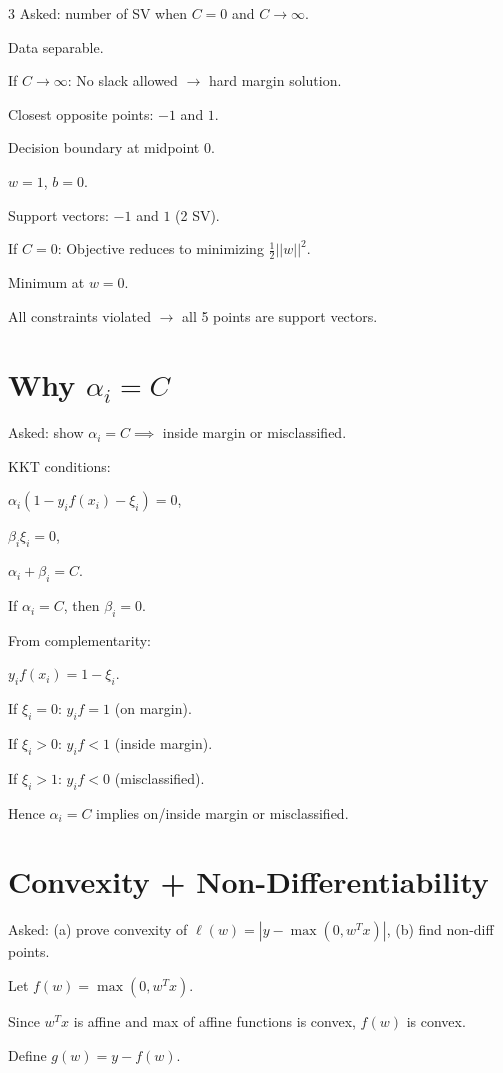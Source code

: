 \documentclass[8pt,fleqn]{extarticle}
\begin{document}
\begin{multicols}{3}
Asked: number of SV when $C=0$ and $C\to\infty$.

Data separable.

If $C\to\infty$:
No slack allowed $\to$ hard margin solution.

Closest opposite points: $-1$ and $1$.

Decision boundary at midpoint $0$.

$w=1$, $b=0$.

Support vectors: $-1$ and $1$ (2 SV).

If $C=0$:
Objective reduces to minimizing $\frac12||w||^2$.

Minimum at $w=0$.

All constraints violated $\to$ all 5 points are support vectors.


\section*{Why $\alpha_i=C$}

Asked: show $\alpha_i=C \implies$ inside margin or misclassified.

KKT conditions:

$\alpha_i(1-y_if(x_i)-\xi_i)=0$,

$\beta_i\xi_i=0$,

$\alpha_i+\beta_i=C$.

If $\alpha_i=C$,
then $\beta_i=0$.

From complementarity:

$y_if(x_i)=1-\xi_i$.

If $\xi_i=0$:
$y_if=1$ (on margin).

If $\xi_i>0$:
$y_if<1$ (inside margin).

If $\xi_i>1$:
$y_if<0$ (misclassified).

Hence $\alpha_i=C$ implies on/inside margin or misclassified.


\section*{Convexity + Non-Differentiability}

Asked:
(a) prove convexity of $\ell(w)=|y-\max(0,w^Tx)|$,
(b) find non-diff points.

Let $f(w)=\max(0,w^Tx)$.

Since $w^Tx$ is affine and max of affine functions is convex,
$f(w)$ is convex.

Define $g(w)=y-f(w)$.


\end{multicols}
\end{document}
